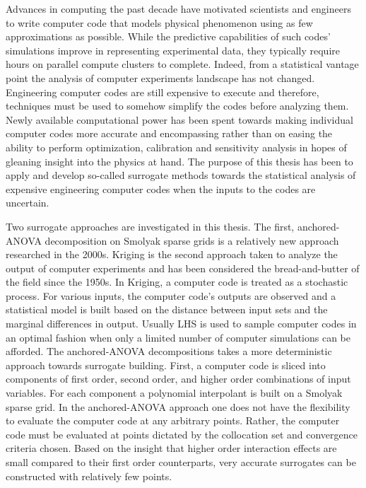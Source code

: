 Advances in computing the past decade have motivated scientists and engineers to write computer code that models physical phenomenon using as few approximations as possible. While the predictive capabilities of such codes' simulations improve in representing experimental data, they typically require hours on parallel compute clusters to complete. Indeed, from a statistical vantage point the analysis of computer experiments landscape has not changed. Engineering computer codes are still expensive to execute and therefore, techniques must be used to somehow simplify the codes before analyzing them. Newly available computational power has been spent towards making individual computer codes more accurate and encompassing rather than on easing the ability to perform optimization, calibration and sensitivity analysis in hopes of gleaning insight into the physics at hand. The purpose of this thesis has been to apply and develop so-called surrogate methods towards the statistical analysis of expensive engineering computer codes when the inputs to the codes are uncertain. 

Two surrogate approaches are investigated in this thesis. The first, anchored-\ac{ANOVA} decomposition on Smolyak sparse grids is a relatively new approach researched in the 2000s. Kriging is the second approach taken to analyze the output of computer experiments and has been considered the bread-and-butter of the field since the 1950s. In Kriging, a computer code is treated as a stochastic process. For various inputs, the computer code's outputs are observed and a statistical model is built based on the distance between input sets and the marginal differences in output. Usually \ac{LHS} is used to sample computer codes in an optimal fashion when only a limited number of computer simulations can be afforded. The anchored-\ac{ANOVA} decompositions takes a more deterministic approach towards surrogate building. First, a computer code is sliced into components of first order, second order, and higher order combinations of input variables. For each component a polynomial interpolant is built on a Smolyak sparse grid. In the anchored-\ac{ANOVA} approach one does not have the flexibility to evaluate the computer code at any arbitrary points. Rather, the computer code must be evaluated at points dictated by the collocation set and convergence criteria chosen. Based on the insight that higher order interaction effects are small compared to their first order counterparts, very accurate surrogates can be constructed with relatively few points. 

